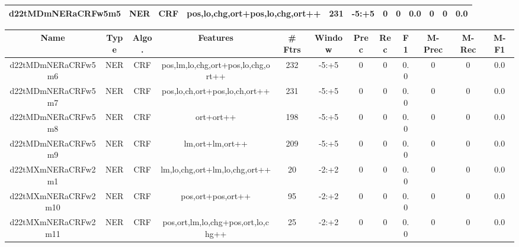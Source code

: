 \documentclass[a4paper]{article}
\begin{document}
\begin{landscape}
\begin{center}
\begin{tabular}{ |c|c|c|c|c|c|c|c|c|c|c|c|}
 
 	
 	\small{ d22tMDmNERaCRFw5m5 } & \small{ NER} & \small{  CRF }  & pos,lo,chg,ort+pos,lo,chg,ort++  &  231 &  \small{  -5:+5 }  &  0 & 0 & 0.0  &  0 & 0 & 0.0 \\
 	
 \hline
\end{tabular}
\end{center}




\begin{center}
\begin{tabular}{ |c|c|c|c|c|c|c|c|c|c|c|c|} 
 \hline
 	Name & Type & Algo. & Features & \# Ftrs & Window & Prec & Rec & F1 & M-Prec & M-Rec & M-F1\\
 \hline

 	

 
 	
 	\small{ d22tMDmNERaCRFw5m6 } & \small{ NER} & \small{  CRF }  & pos,lm,lo,chg,ort+pos,lo,chg,ort++  &  232 &  \small{  -5:+5 }  &  0 & 0 & 0.0  &  0 & 0 & 0.0 \\
 	

 
 	
 	\small{ d22tMDmNERaCRFw5m7 } & \small{ NER} & \small{  CRF }  & pos,lo,ch,ort+pos,lo,ch,ort++  &  231 &  \small{  -5:+5 }  &  0 & 0 & 0.0  &  0 & 0 & 0.0 \\
 	

 
 	
 	\small{ d22tMDmNERaCRFw5m8 } & \small{ NER} & \small{  CRF }  & ort+ort++  &  198 &  \small{  -5:+5 }  &  0 & 0 & 0.0  &  0 & 0 & 0.0 \\
 	

 
 	
 	\small{ d22tMDmNERaCRFw5m9 } & \small{ NER} & \small{  CRF }  & lm,ort+lm,ort++  &  209 &  \small{  -5:+5 }  &  0 & 0 & 0.0  &  0 & 0 & 0.0 \\
 	

 
 	
 	\small{ d22tMXmNERaCRFw2m1 } & \small{ NER} & \small{  CRF }  & lm,lo,chg,ort+lm,lo,chg,ort++  &  20 &  \small{  -2:+2 }  &  0 & 0 & 0.0  &  0 & 0 & 0.0 \\
 	

 
 	
 	\small{ d22tMXmNERaCRFw2m10 } & \small{ NER} & \small{  CRF }  & pos,ort+pos,ort++  &  95 &  \small{  -2:+2 }  &  0 & 0 & 0.0  &  0 & 0 & 0.0 \\
 	

 
 	
 	\small{ d22tMXmNERaCRFw2m11 } & \small{ NER} & \small{  CRF }  & pos,ort,lm,lo,chg+pos,ort,lo,chg++  &  25 &  \small{  -2:+2 }  &  0 & 0 & 0.0  &  0 & 0 & 0.0 \\
 	


\end{tabular}
\end{center}
\end{landscape}
\end{document}
